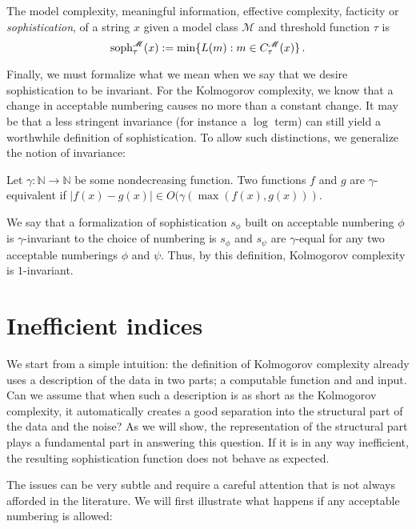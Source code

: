\documentclass{style/llncs}
\newcommand{\M}{\mathscr M}
\newcommand{\N}{\mathbb N}
\newcommand{\tn}[1]{\textnormal{#1}}
\newcommand{\s}{\tn{soph}}
\newcommand{\p}{\,\text{.}}
\begin{document}
\begin{definition}[Sophistication]
  The model complexity, meaningful information, effective complexity, facticity or \emph{sophistication},  of a string $x$ given a model class $\M$ and threshold function $\tau$ is
  \[
  \s_\tau^{\M}(x):=\min\{L(m):m\in C^\M_\tau(x)\}\p
  \]\label{definition:sophistication}
\end{definition}

Finally, we must formalize what we mean when we say that we desire sophistication to be invariant. For the Kolmogorov complexity, we know that a change in acceptable numbering causes no more than a constant change. It may be that a less stringent invariance (for instance a $\log$ term) can still yield a worthwhile definition of sophistication. To allow such distinctions, we generalize the notion of invariance:

\begin{definition}
Let $\gamma:\N\to \N$ be some nondecreasing function. Two functions $f$ and $g$ are $\gamma$-equivalent if $|f(x) - g(x)| \in O(\gamma(\max(f(x), g(x)))$.
\end{definition}

We say that a formalization of sophistication $s_\phi$ built on acceptable numbering $\phi$ is $\gamma$-invariant to the choice of numbering is $s_\phi$ and $s_\psi$ are $\gamma$-equal for any two acceptable numberings $\phi$ and $\psi$. Thus, by this definition, Kolmogorov complexity is $1$-invariant.

\section{Inefficient indices}

We start from a simple intuition: the definition of Kolmogorov complexity already uses a description of the data in two parts; a computable function and and input. Can we assume that when such a description is as short as the Kolmogorov complexity, it automatically creates a good separation into the structural part of the data and the noise? As we will show, the representation of the structural part plays a fundamental part in answering this question. If it is in any way inefficient, the resulting sophistication function does not behave as expected.

The issues can be very subtle and require a careful attention that is not always afforded in the literature. We will first illustrate what happens if any acceptable numbering is allowed:
\end{document}

